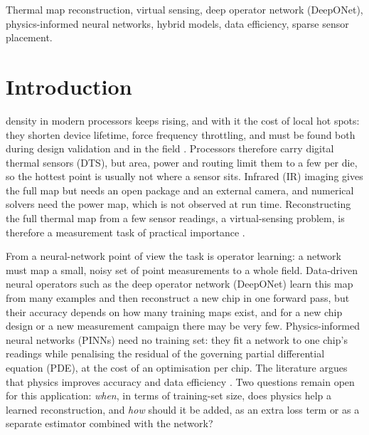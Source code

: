\documentclass[journal]{IEEEtran}
\begin{document}
\begin{IEEEkeywords}
Thermal map reconstruction, virtual sensing, deep operator network (DeepONet), physics-informed neural networks, hybrid models, data efficiency, sparse sensor placement.
\end{IEEEkeywords}

\section{Introduction}
 density in modern processors keeps rising, and with it the cost of local hot spots: they shorten device lifetime, force frequency throttling, and must be found both during design validation and in the field \cite{skadron2003temperature,brooks2001dtm}.
Processors therefore carry digital thermal sensors (DTS), but area, power and routing limit them to a few per die, so the hottest point is usually not where a sensor sits.
Infrared (IR) imaging gives the full map but needs an open package and an external camera, and numerical solvers need the power map, which is not observed at run time.
Reconstructing the full thermal map from a few sensor readings, a virtual-sensing problem, is therefore a measurement task of practical importance \cite{nowroz2010thermal,ranieri2012eigenmaps,sadiqbatcha2022tracking}.

From a neural-network point of view the task is operator learning: a network must map a small, noisy set of point measurements to a whole field.
Data-driven neural operators such as the deep operator network (DeepONet) \cite{lu2021deeponet} learn this map from many examples and then reconstruct a new chip in one forward pass, but their accuracy depends on how many training maps exist, and for a new chip design or a new measurement campaign there may be very few.
Physics-informed neural networks (PINNs) \cite{raissi2019pinn,karniadakis2021piml,cuomo2022sciml} need no training set: they fit a network to one chip's readings while penalising the residual of the governing partial differential equation (PDE), at the cost of an optimisation per chip.
The literature argues that physics improves accuracy and data efficiency \cite{karniadakis2021piml,willard2022integrating,cai2021heat,du2025review}.
Two questions remain open for this application: \emph{when}, in terms of training-set size, does physics help a learned reconstruction, and \emph{how} should it be added, as an extra loss term \cite{wang2021pideeponet} or as a separate estimator combined with the network?
\end{document}
